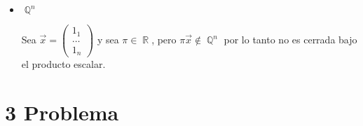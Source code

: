 \documentclass[12pt, fleqn]{article}                             %
\newenvironment{SmallIndentation}[1][0.75em]                    %
        {\begin{adjustwidth}{#1}{}\begin{footnotesize}}             %
        {\end{footnotesize}\end{adjustwidth}}                       %
\DeclareMathOperator \Space {\quad}                             %
\DeclareMathOperator \MiniSpace {\;}                            %
\theoremstyle{break}                                            %
\DeclareMathOperator \Racionals    {\mathbb{Q}}                 %
\DeclareMathOperator \Reals        {\mathbb{R}}                 %
\DeclareMathOperator \GenericField {\mathbb{F}}                 %
\newcommand{\pVector}[1]                                        %
        { \ensuremath{\begin{pmatrix}#1\end{pmatrix}} }             %
\begin{document}
\begin{itemize}
\begin{SmallIndentation}[1em]
\begin{enumerate}
                    \item 
                        \textbf{Ley Multiplicativa Asociativa:}
                        $\forall \alpha, \beta \in \GenericField, \MiniSpace
                            \forall \vec{v} \in \Reals, \MiniSpace
                                \alpha \cdot (\beta \cdot \vec{v}) = (\alpha \beta) \cdot \vec{v}$

                    \item 
                        \textbf{Ley Multiplicativa Distributiva:}
                        $\forall \alpha, \beta \in \GenericField, \MiniSpace
                            \forall \vec{v} \in \Reals, \MiniSpace
                                (\alpha + \beta) \cdot \vec{v} = 
                                        (\alpha \cdot \vec{v}) + (\beta \cdot \vec{v})$

                    \item 
                        \textbf{Elemento Indentidad Multiplicativo:}
                        $\exists 1 \in \GenericField, \MiniSpace
                            \forall \vec{v} \in \Reals, \MiniSpace 1 \cdot \vec{v} = \vec{v}$

                \end{enumerate}

            \end{SmallIndentation}

        \item 

            $\Racionals^n$

            Sea $\vec x = \pVector{1_1\\\dots\\1_n}$
            y sea $\pi \in \Reals$, pero $\pi \vec x \not \in \Racionals^n$
            por lo tanto no es cerrada bajo el producto escalar.


    \end{itemize}



\clearpage
\section{3 Problema}
\end{document}

